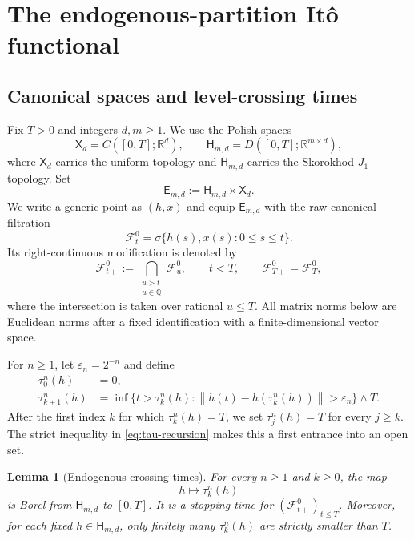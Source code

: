 \documentclass[11pt,reqno]{amsart}
\theoremstyle{plain}
\newtheorem{lemma}[lemma]{Lemma}
\theoremstyle{definition}
\newcommand{\R}{\mathbb R}
\newcommand{\cF}{\mathcal F}
\newcommand{\eps}{\varepsilon}
\newcommand{\norm}[1]{\left\lVert #1\right\rVert}
\begin{document}
\section{The endogenous-partition It\^o functional}
\label{sec:integral}

\subsection{Canonical spaces and level-crossing times}

Fix \(T>0\) and integers \(d,m\ge1\).  We use the Polish spaces
\[
  \mathsf X_d=C([0,T];\R^d),\qquad
  \mathsf H_{m,d}=D([0,T];\R^{m\times d}),
\]
where \(\mathsf X_d\) carries the uniform topology and
\(\mathsf H_{m,d}\) carries the Skorokhod \(J_1\)-topology.  Set
\[
  \mathsf E_{m,d}:=\mathsf H_{m,d}\times\mathsf X_d.
\]
We write a generic point as \((h,x)\) and equip \(\mathsf E_{m,d}\) with the
raw canonical filtration
\[
  \cF_t^0
  =
  \sigma\{h(s),x(s):0\le s\le t\}.
\]
Its right-continuous modification is denoted by
\[
  \cF_{t+}^0
  :=
  \bigcap_{\substack{u>t\\u\in\mathbb Q}}\cF_u^0,
  \qquad t<T,
  \qquad
  \cF_{T+}^0=\cF_T^0,
\]
where the intersection is taken over rational \(u\le T\).
All matrix norms below are Euclidean norms after a fixed identification with
a finite-dimensional vector space.

For \(n\ge1\), let \(\eps_n=2^{-n}\) and define
\begin{align}
  \tau_0^n(h)&=0, \label{eq:tau-zero}\\
  \tau_{k+1}^n(h)
  &=
  \inf\bigl\{
      t>\tau_k^n(h):
      \norm{h(t)-h(\tau_k^n(h))}>\eps_n
  \bigr\}\wedge T . \label{eq:tau-recursion}
\end{align}
After the first index \(k\) for which \(\tau_k^n(h)=T\), we set
\(\tau_j^n(h)=T\) for every \(j\ge k\).  The strict inequality in
\eqref{eq:tau-recursion} makes this a first entrance into an open set.

\begin{lemma}[Endogenous crossing times]\label{lem:crossing-times}
For every \(n\ge1\) and \(k\ge0\), the map
\[
  h\longmapsto\tau_k^n(h)
\]
is Borel from \(\mathsf H_{m,d}\) to \([0,T]\).  It is a stopping time for
\((\cF_{t+}^0)_{t\le T}\).  Moreover, for each fixed
\(h\in\mathsf H_{m,d}\), only finitely many \(\tau_k^n(h)\) are strictly
smaller than \(T\).
\end{lemma}
\end{document}
